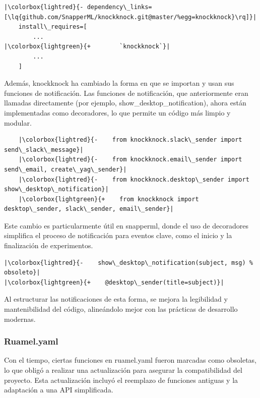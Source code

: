\begin{verbatim}
|\colorbox{lightred}{- dependency\_links=[\lq{github.com/SnapperML/knockknock.git@master/%egg=knockknock}\rq]}|
    install\_requires=[
        ...
|\colorbox{lightgreen}{+        `knockknock`}|
        ...
    ]
\end{verbatim}

Además, knockknock ha cambiado la forma en que se importan y usan sus funciones de notificación. Las funciones de notificación, que anteriormente eran llamadas directamente (por ejemplo, show\_desktop\_notification), ahora están implementadas como decoradores, lo que permite un código más limpio y modular.
\begin{verbatim}
    |\colorbox{lightred}{-    from knockknock.slack\_sender import send\_slack\_message}|
    |\colorbox{lightred}{-    from knockknock.email\_sender import send\_email, create\_yag\_sender}|
    |\colorbox{lightred}{-    from knockknock.desktop\_sender import show\_desktop\_notification}|
    |\colorbox{lightgreen}{+    from knockknock import desktop\_sender, slack\_sender, email\_sender}|
        \end{verbatim}

Este cambio es particularmente útil en \Gls{snapperml}, donde el uso de decoradores simplifica el proceso de notificación para eventos clave, como el inicio y la finalización de experimentos.
\begin{verbatim}
|\colorbox{lightred}{-    show\_desktop\_notification(subject, msg) % obsoleto}|
|\colorbox{lightgreen}{+    @desktop\_sender(title=subject)}|
\end{verbatim}

Al estructurar las notificaciones de esta forma, se mejora la legibilidad y mantenibilidad del código, alineándolo mejor con las prácticas de desarrollo modernas.

\subsubsection{Ruamel.yaml}
Con el tiempo, ciertas funciones en ruamel.yaml fueron marcadas como obsoletas, lo que obligó a realizar una actualización para asegurar la compatibilidad del proyecto. Esta actualización incluyó el reemplazo de funciones antiguas y la adaptación a una API simplificada.

